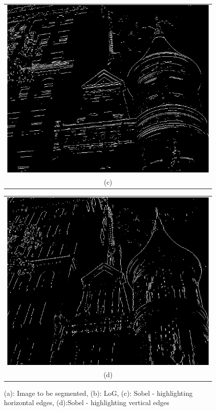 \begin{figure}[h!]
\begin{minipage}{.45\textwidth}
\end{minipage}
\\
\begin{minipage}{.45\textwidth}
\begin{tabular}{c}
\includegraphics[width=.9\textwidth]{backgroundTheory/segmentation/sobelHorizontal} \\
(c)
\end{tabular}
\end{minipage}
\begin{minipage}{.45\textwidth}
\begin{tabular}{c}
\includegraphics[width=.9\textwidth]{backgroundTheory/segmentation/sobelVertical} \\
(d)
\end{tabular}
\end{minipage}
\caption{(a): Image to be segmented, (b): LoG, (c): Sobel - highlighting horizontal edges, (d):Sobel - highlighting vertical edges}
\label{edgeSeg}
\end{figure}

